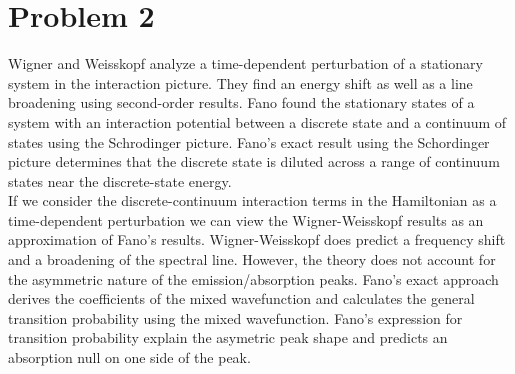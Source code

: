 \documentclass[a4paper,11pt]{article}
\numberwithin{equation}{section}
\begin{document}
\section{Problem 2}
Wigner and Weisskopf analyze a time-dependent perturbation of a stationary system in the interaction picture. 
They find an energy shift as well as a line broadening using second-order results.
Fano found the stationary states of a system with an interaction potential between a discrete state and a continuum of states using the Schrodinger picture. 
Fano's exact result using the Schordinger picture determines that the discrete state is diluted across a range of continuum states near the discrete-state energy.\\
If we consider the discrete-continuum interaction terms in the Hamiltonian as a time-dependent perturbation we can view the Wigner-Weisskopf results as an approximation of Fano's results.
Wigner-Weisskopf does predict a frequency shift and a broadening of the spectral line. However, the theory does not account for the asymmetric nature of the emission/absorption peaks.
Fano's exact approach derives the coefficients of the mixed wavefunction and calculates the general transition probability using the mixed wavefunction.
Fano's expression for transition probability explain the asymetric peak shape and predicts an absorption null on one side of the peak.
\end{document}
